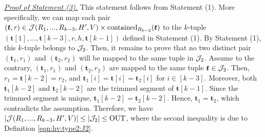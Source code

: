 \vgap 

\noindent \underline{\em Proof of Statement (3).}
 This statement follows from Statement (1). More specifically, we can map each pair $(\textrm{\boldmath${t}$}, r)\in \mathcal{J}(R_1,...,R_{k-3},H',V) \times \mathrm{contained}_{R_{k-2}}(\textrm{\boldmath${t}$})$ to the $k$-tuple $(\bm{t}[1], ..., \bm{t}[k-3], r, h, \bm{t}[k-1])$ defined in Statement (1). By Statement (1), this $k$-tuple belongs to $\mathcal{J}_2$. Then, it remains to prove that no two distinct pair $(\bm{t}_1, r_1)$ and $(\bm{t}_2, r_2)$ will be mapped to the same tuple in $\mathcal{J}_2$. Assume to the contrary, $(\bm{t}_1, r_1)$ and $(\bm{t}_2, r_2)$ are mapped to the same tuple $\textrm{\boldmath${t}$} \in \mathcal{J}_2$. Then, $r_1 = \bm{t}[k-2] = r_2$, and $\bm{t}_1[i] = \bm{t}[i] = \bm{t}_2[i]$ for $i \in [k-3]$. Moreover, both $\bm{t}_1[k-2]$ and $\bm{t}_2[k-2]$ are the trimmed segment of $\bm{t}[k-1]$. Since the trimmed segment is unique, $\bm{t}_1[k-2] = \bm{t}_2[k-2]$. Hence, $\bm{t}_1 = \bm{t}_2$, which contradicts the assumption. Therefore, we have $|\mathcal{J}(R_1,...,R_{k-3},H',V)| \le |\mathcal{J}_2| \le \mathrm{OUT}$, where the second inequality is due to Definition \eqref{eqn:hv:type2:J2}.
